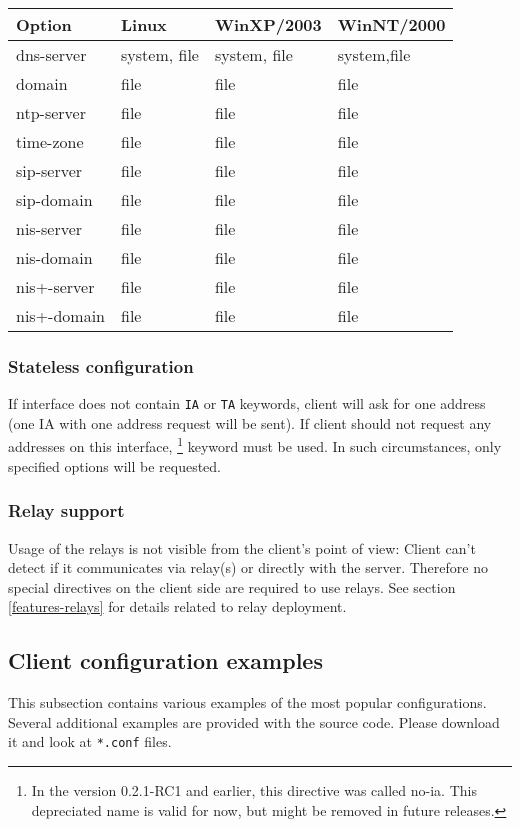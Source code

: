 \begin{center}
\begin{tabular}{|l|l|l|l|}
\hline
Option & Linux & WinXP/2003 & WinNT/2000  \\
\hline
dns-server  & system, file & system, file & system,file \\
domain      & file         & file & file \\
ntp-server  & file         & file & file \\
time-zone   & file         & file & file \\
sip-server  & file         & file & file \\
sip-domain  & file         & file & file \\
nis-server  & file         & file & file \\
nis-domain  & file         & file & file \\
nis+-server & file         & file & file \\
nis+-domain & file         & file & file \\
\hline
\end{tabular}
\end{center}

\subsubsection{Stateless configuration}

If interface does not contain \verb+IA+ or \verb+TA+ keywords, client
will ask for one address (one IA with one address request will be sent).
If client should not request any addresses on this interface,
\footnote{In the version 0.2.1-RC1 and earlier, this
  directive was called no-ia. This depreciated name is valid for now,
  but might be removed in future releases.} keyword must be used. In
such circumstances, only specified options will be requested.

\subsubsection{Relay support}
Usage of the relays is not visible from the client's point of view:
Client can't detect if it communicates via relay(s) or directly
with the server. Therefore no special directives on the client side 
are required to use relays. See section \ref{features-relays} for
details related to relay deployment.

\subsection{Client configuration examples}
This subsection contains various examples of the most popular
configurations. Several additional examples are provided with the source
code. Please download it and look at \verb+*.conf+ files.

